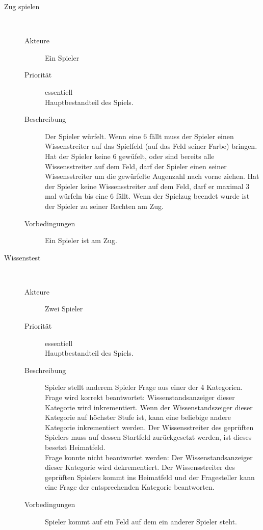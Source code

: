 \documentclass{scrartcl} %
\begin{document}
\begin{description}
   \item[Zug spielen]~\par
   \begin{description}
      \item[Akteure] Ein Spieler
      \item[Priorität] essentiell\\Hauptbestandteil des Spiels.
      \item[Beschreibung] Der Spieler würfelt. Wenn eine 6 fällt muss der Spieler einen Wissenstreiter auf das Spielfeld (auf das Feld seiner Farbe) bringen. Hat der Spieler keine 6 gewüfelt, oder sind bereits alle Wissensstreiter auf dem Feld, darf der Spieler einen seiner Wissensstreiter um die gewürfelte Augenzahl nach vorne ziehen. Hat der Spieler keine Wissensstreiter auf dem Feld, darf er maximal 3 mal würfeln bis eine 6 fällt. Wenn der Spielzug beendet wurde ist der Spieler zu seiner Rechten am Zug.
      \item[Vorbedingungen] Ein Spieler ist am Zug.
   \end{description}
   

   \item[Wissenstest]~\par
   \begin{description}
      \item[Akteure] Zwei Spieler
      \item[Priorität] essentiell\\Hauptbestandteil des Spiels.
      \item[Beschreibung] Spieler stellt anderem Spieler Frage aus einer der 4 Kategorien.\\
Frage wird korrekt beantwortet: Wissenstandsanzeiger dieser Kategorie wird inkrementiert. Wenn der Wissenstandszeiger dieser Kategorie auf höchster Stufe ist, kann eine beliebige andere Kategorie inkrementiert werden. Der Wissensstreiter des geprüften Spielers muss auf dessen Startfeld zurückgesetzt werden, ist dieses besetzt Heimatfeld.\\
Frage konnte nicht beantwortet werden: Der Wissenstandsanzeiger dieser Kategorie wird dekrementiert. Der Wissensstreiter des geprüften Spielers kommt ins Heimatfeld und der Fragesteller kann eine Frage der entsprechenden Kategorie beantworten.
      \item[Vorbedingungen] Spieler kommt auf ein Feld auf dem ein anderer Spieler steht.
   \end{description}
   


\end{description}
\end{document}
